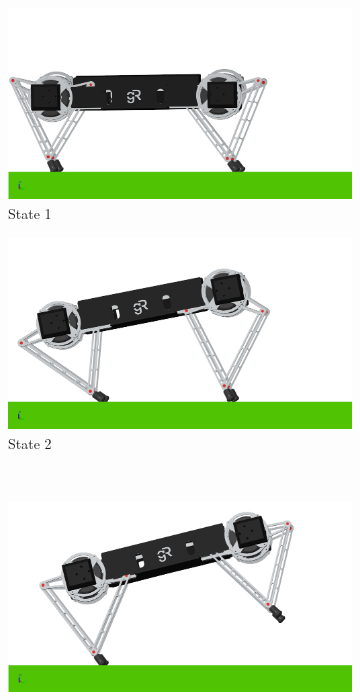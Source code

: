 \documentclass[conference,11pt,letterpaper]{IEEEtran}
\begin{document}
\begin{figure}[t!]
    \centering
    \begin{subfigure}[t]{0.45\linewidth}
        \includegraphics[width=\textwidth]{symm_snap1}
        \caption{State 1}
    \end{subfigure}%
    \begin{subfigure}[t]{0.45\linewidth}
        \includegraphics[width=\textwidth]{symm_snap2}
        \caption{State 2}
    \end{subfigure} \\
    \begin{subfigure}[t]{0.45\linewidth}
        \includegraphics[width=\textwidth]{symm_snap3}

\end{subfigure}
\end{figure}
\end{document}
